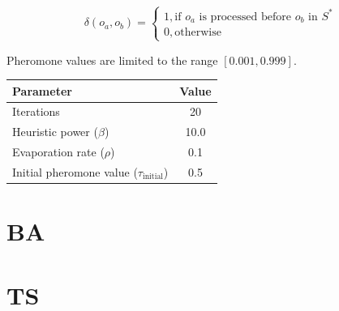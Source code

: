 \documentclass[paper=a4, fontsize=9pt]{scrartcl}
\begin{document}
\begin{multicols}{2}
\begin{equation}
\delta(o_a, o_b) =
\begin{cases}
1, \text{if $o_a$ is processed before $o_b$ in $S^{*}$}\\
0, \text{otherwise}
\end{cases}
\label{eq:acodelta}
\end{equation}

Pheromone values are limited to the range $[0.001, 0.999]$.

{
\vspace{0.2cm}
\begin{minipage}{\linewidth{}}
\centering
\begin{tabular}{lc}
\toprule
Parameter                                         & Value \\
\midrule
Iterations                                        & 20    \\
Heuristic power ($\beta$)                         & 10.0  \\
Evaporation rate ($\rho$)                         &  0.1  \\
Initial pheromone value ($\tau_{\text{initial}}$) &  0.5  \\
\bottomrule
\end{tabular}
\label{table:acoparams}
\end{minipage}
}







\section*{\acl{BA}}


\section*{\acl{TS}}





\end{multicols}
\end{document}
